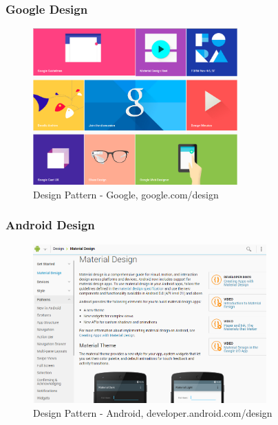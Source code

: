 \documentclass[presentation]{beamer}
\begin{document}
\begin{frame}[c]\frametitle{Google Design}
    
\begin{figure}[tb]
    \begin{center}
        \includegraphics[width=0.7\textwidth]{img/google-com-design.png}
    \end{center}
    \caption{Design Pattern - Google, google.com/design}
    \label{fig:google-com-design}
\end{figure}

\end{frame}

\begin{frame}[c]\frametitle{Android Design}
    
\begin{figure}[tb]
    \begin{center}
        \includegraphics[width=0.8\textwidth]{img/google-android.png}
    \end{center}
    \caption{Design Pattern - Android, developer.android.com/design}
    \label{fig:google-android}
\end{figure}
\end{frame}
\end{document}
